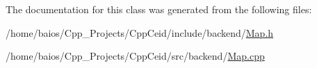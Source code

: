 The documentation for this class was generated from the following files\-:\begin{DoxyCompactItemize}
\item 
/home/baios/\-Cpp\-\_\-\-Projects/\-Cpp\-Ceid/include/backend/\hyperlink{_map_8h}{Map.\-h}\item 
/home/baios/\-Cpp\-\_\-\-Projects/\-Cpp\-Ceid/src/backend/\hyperlink{_map_8cpp}{Map.\-cpp}\end{DoxyCompactItemize}
